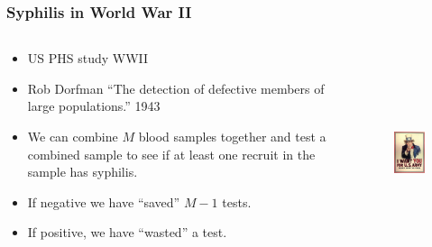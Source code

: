\documentclass{beamer}
\begin{document}
\begin{frame}
  \frametitle{Syphilis in World War II}

\begin{columns}
\begin{column}{.48\textwidth}

  \begin{itemize}
  \item US PHS study WWII
  \item Rob Dorfman ``The detection of defective members of large populations.''  1943
  \item We can combine $M$ blood samples together and test a combined sample to see if at least one recruit in the sample has syphilis. 
  \item If negative we have ``saved'' $M-1$ tests. 
  \item If positive, we have ``wasted'' a test. 
  \end{itemize}

\end{column}

\begin{column}{.48\textwidth}
  \begin{figure}[h]
\includegraphics[height = 6cm]{unclesam.jpg}    

  \end{figure}

\end{column}%
\end{columns}

\end{frame}
\end{document}
